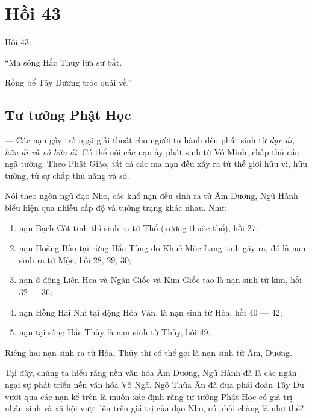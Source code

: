 \chapter{Hồi 43} %
\label{cha:hoi_43}

Hồi 43:

\begin{itshape}
``Ma sông Hắc Thủy lừa sư bắt.

Rồng bể Tây Dương tróc quái về.''
\end{itshape}

\section{Tư tưởng Phật Học} %
\label{sec:43_phat_hoc}

--- Các nạn gây trở ngại giải thoát cho người tu hành đều phát sinh từ \emph{dục ái, hữu ái và vô hữu ái}. Có thể nói các nạn ấy phát sinh từ Vô Minh, chấp thủ các ngã tướng. Theo Phật Giáo, tất cả các ma nạn đều xẩy ra từ thế giới hữu vi, hữu tướng, từ sự chấp thủ năng và sở.

Nói theo ngôn ngữ đạo Nho, các khổ nạn đều sinh ra từ Âm Dương, Ngũ Hành biểu hiện qua nhiều cấp độ và tướng trạng khác nhau. Như:

\begin{enumerate}[label=\itshape\arabic*\upshape/]
    \item nạn Bạch Cốt tinh thì sinh ra từ Thổ (xương thuộc thổ), hồi 27;

    \item nạn Hoàng Bào tại rừng Hắc Tùng do Khuê Mộc Lang tinh gây ra, đó là nạn sinh ra từ Mộc, hồi 28, 29, 30;

    \item nạn ở động Liên Hoa và Ngân Giốc và Kim Giốc tạo là nạn sinh từ kim, hồi 32 --- 36;

    \item nạn Hồng Hài Nhi tại động Hỏa Vân, là nạn sinh từ Hỏa, hồi 40 --- 42;

    \item nạn tại sông Hắc Thủy là nạn sinh từ Thủy, hồi 49.
\end{enumerate}

Riêng hai nạn sinh ra từ Hỏa, Thủy thì có thể gọi là nạn sinh từ Âm, Dương.

Tại đây, chúng ta hiểu rằng nền văn hóa Âm Dương, Ngũ Hành đã là các ngăn ngại sự phát triển nền văn hóa Vô Ngã. Ngô Thừa Ân đã đưa phái đoàn Tây Du vượt qua các nạn kể trên là muốn xác định rằng tư tưởng Phật Học có giá trị nhân sinh và xã hội vượt lên trên giá trị của đạo Nho, có phải chăng là như thế?


